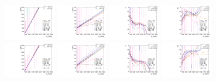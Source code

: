 \begin{figure}[htbp]
  \includegraphics[width=0.2\textwidth]{fig/2Dfit/paramSignalShape_allSig_MVV_HP_nobb_HDy_MEAN.pdf}
  \includegraphics[width=0.2\textwidth]{fig/2Dfit/paramSignalShape_allSig_MVV_HP_nobb_HDy_SIGMA.pdf}
  \includegraphics[width=0.2\textwidth]{fig/2Dfit/paramSignalShape_allSig_MVV_HP_nobb_HDy_ALPHA1.pdf}
  \includegraphics[width=0.2\textwidth]{fig/2Dfit/paramSignalShape_allSig_MVV_HP_nobb_HDy_ALPHA2.pdf}\\
  \includegraphics[width=0.2\textwidth]{fig/2Dfit/paramSignalShape_allSig_MVV_LP_nobb_HDy_MEAN.pdf}
  \includegraphics[width=0.2\textwidth]{fig/2Dfit/paramSignalShape_allSig_MVV_LP_nobb_HDy_SIGMA.pdf}
  \includegraphics[width=0.2\textwidth]{fig/2Dfit/paramSignalShape_allSig_MVV_LP_nobb_HDy_ALPHA1.pdf}
  \includegraphics[width=0.2\textwidth]{fig/2Dfit/paramSignalShape_allSig_MVV_LP_nobb_HDy_ALPHA2.pdf}\\

\end{figure}
